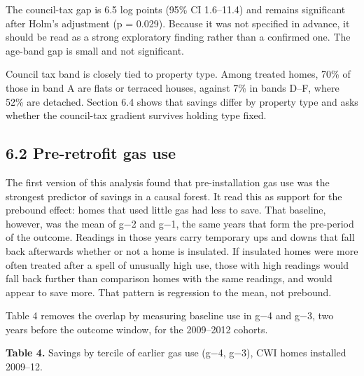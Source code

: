 \documentclass[11pt,a4paper]{article}
\begin{document}
The council-tax gap is 6.5 log points (95\% CI 1.6--11.4) and remains significant after Holm's adjustment (p = 0.029). Because it was not specified in advance, it should be read as a strong exploratory finding rather than a confirmed one. The age-band gap is small and not significant.

Council tax band is closely tied to property type. Among treated homes, 70\% of those in band A are flats or terraced houses, against 7\% in bands D--F, where 52\% are detached. Section 6.4 shows that savings differ by property type and asks whether the council-tax gradient survives holding type fixed.

\subsection*{6.2 Pre-retrofit gas use}

The first version of this analysis found that pre-installation gas use was the strongest predictor of savings in a causal forest. It read this as support for the prebound effect: homes that used little gas had less to save. That baseline, however, was the mean of g−2 and g−1, the same years that form the pre-period of the outcome. Readings in those years carry temporary ups and downs that fall back afterwards whether or not a home is insulated. If insulated homes were more often treated after a spell of unusually high use, those with high readings would fall back further than comparison homes with the same readings, and would appear to save more. That pattern is regression to the mean, not prebound.

Table 4 removes the overlap by measuring baseline use in g−4 and g−3, two years before the outcome window, for the 2009--2012 cohorts.

\textbf{Table 4.} Savings by tercile of earlier gas use (g−4, g−3), CWI homes installed 2009--12.
\end{document}
